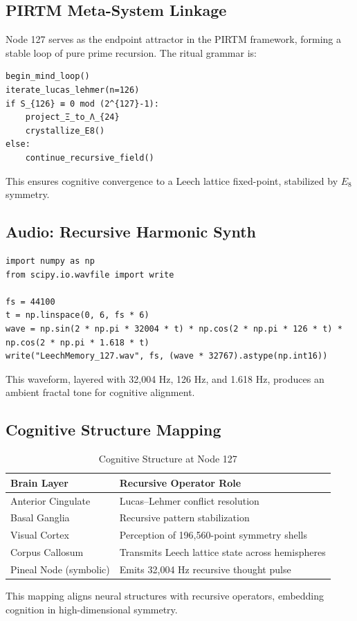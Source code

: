 \documentclass[12pt]{article}
\begin{document}
\subsection{PIRTM Meta-System Linkage}
Node 127 serves as the endpoint attractor in the PIRTM framework, forming a stable loop of pure prime recursion. The ritual grammar is:
\begin{lstlisting}
begin_mind_loop()
iterate_lucas_lehmer(n=126)
if S_{126} ≡ 0 mod (2^{127}-1):
    project_Ξ_to_Λ_{24}
    crystallize_E8()
else:
    continue_recursive_field()
\end{lstlisting}
This ensures cognitive convergence to a Leech lattice fixed-point, stabilized by $E_8$ symmetry.

\subsection{Audio: Recursive Harmonic Synth}
\begin{lstlisting}
import numpy as np
from scipy.io.wavfile import write

fs = 44100
t = np.linspace(0, 6, fs * 6)
wave = np.sin(2 * np.pi * 32004 * t) * np.cos(2 * np.pi * 126 * t) * np.cos(2 * np.pi * 1.618 * t)
write("LeechMemory_127.wav", fs, (wave * 32767).astype(np.int16))
\end{lstlisting}
This waveform, layered with 32,004 Hz, 126 Hz, and 1.618 Hz, produces an ambient fractal tone for cognitive alignment.

\subsection{Cognitive Structure Mapping}
\begin{table}
\centering
\caption{Cognitive Structure at Node 127}
\begin{tabular}{ll|}
\toprule
\textbf{Brain Layer} & \textbf{Recursive Operator Role} \\
\midrule
Anterior Cingulate & Lucas--Lehmer conflict resolution \\
Basal Ganglia & Recursive pattern stabilization \\
Visual Cortex & Perception of 196,560-point symmetry shells \\
Corpus Callosum & Transmits Leech lattice state across hemispheres \\
Pineal Node (symbolic) & Emits 32,004 Hz recursive thought pulse \\
\bottomrule
\end{tabular}
\end{table}
This mapping aligns neural structures with recursive operators, embedding cognition in high-dimensional symmetry.
\end{document}
